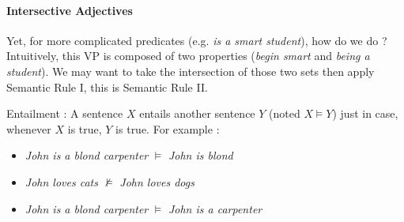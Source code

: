 \documentclass{cours}
\begin{document}
\paragraph{Intersective Adjectives}
Yet, for more complicated predicates (e.g. \textsl{is a smart student}), how do we do ? Intuitively, this VP is composed of two properties (\textsl{begin smart} and \textsl{being a student}). We may want to take the intersection of those two sets then apply Semantic Rule I, this is Semantic Rule II.
\begin{definition}
    Entailment\! : A sentence $X$ entails another sentence $Y$ (noted $X \models Y$) just in case, whenever $X$ is true, $Y$ is true. For example\! :
    \begin{itemize}
        \item \textsl{John is a blond carpenter} $\vDash$ \textsl{John is blond}
        \item \textsl{John loves cats} $\nvDash$ \textsl{John loves dogs}
        \item \textsl{John is a blond carpenter} $\vDash$ \textsl{John is a carpenter}
    \end{itemize}
\end{definition}
\end{document}
